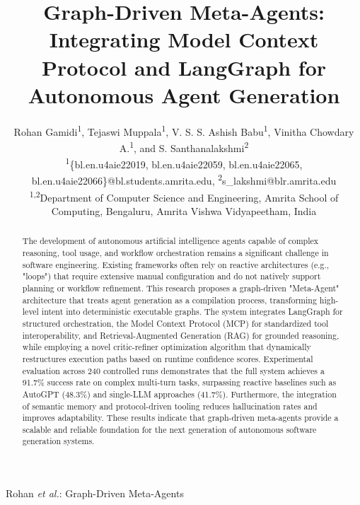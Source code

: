 \documentclass[lettersize,journal]{IEEEtran}
\begin{document}
\title{Graph-Driven Meta-Agents: Integrating Model Context Protocol and LangGraph for Autonomous Agent Generation}

\author{
Rohan Gamidi\textsuperscript{1},
Tejaswi Muppala\textsuperscript{1},
V. S. S. Ashish Babu\textsuperscript{1},
Vinitha Chowdary A.\textsuperscript{1}, and
S. Santhanalakshmi\textsuperscript{2}
\\
\normalsize
\textsuperscript{1}\{bl.en.u4aie22019, bl.en.u4aie22059, bl.en.u4aie22065, bl.en.u4aie22066\}@bl.students.amrita.edu,
\textsuperscript{2}s\_lakshmi@blr.amrita.edu
\\
\normalsize
\textsuperscript{1,2}Department of Computer Science and Engineering, Amrita School of Computing, Bengaluru, Amrita Vishwa Vidyapeetham, India
}

%
{Rohan \MakeLowercase{\textit{et al.}}: Graph-Driven Meta-Agents}

\maketitle

\begin{abstract}
The development of autonomous artificial intelligence agents capable of complex reasoning, tool usage, and workflow orchestration remains a significant challenge in software engineering. Existing frameworks often rely on reactive architectures (e.g., "loops") that require extensive manual configuration and do not natively support planning or workflow refinement. This research proposes a graph-driven "Meta-Agent" architecture that treats agent generation as a compilation process, transforming high-level intent into deterministic executable graphs. The system integrates LangGraph for structured orchestration, the Model Context Protocol (MCP) for standardized tool interoperability, and Retrieval-Augmented Generation (RAG) for grounded reasoning, while employing a novel critic-refiner optimization algorithm that dynamically restructures execution paths based on runtime confidence scores. Experimental evaluation across 240 controlled runs demonstrates that the full system achieves a 91.7\% success rate on complex multi-turn tasks, surpassing reactive baselines such as AutoGPT (48.3\%) and single-LLM approaches (41.7\%). Furthermore, the integration of semantic memory and protocol-driven tooling reduces hallucination rates and improves adaptability. These results indicate that graph-driven meta-agents provide a scalable and reliable foundation for the next generation of autonomous software generation systems.
\end{abstract}
\end{document}
